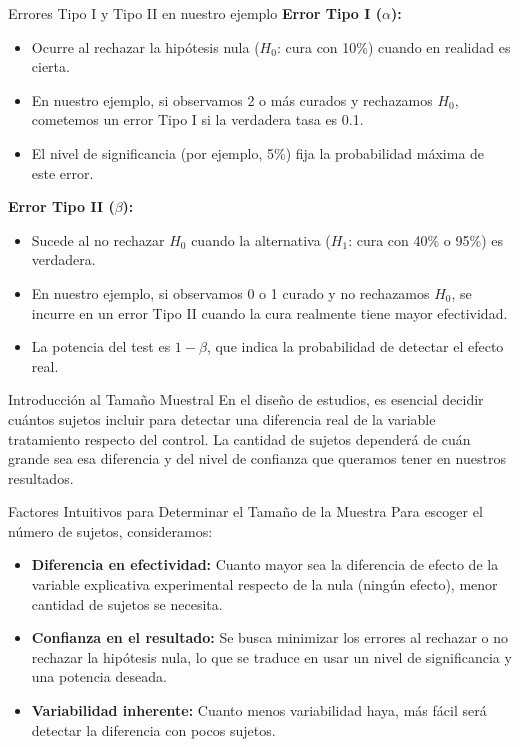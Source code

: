 ﻿\documentclass{beamer}
\begin{document}
\begin{frame}{Errores Tipo I y Tipo II en nuestro ejemplo}
\textbf{Error Tipo I ($\alpha$):}
\begin{itemize}
    \item Ocurre al rechazar la hipótesis nula ($H_0$: cura con 10\%) cuando en realidad es cierta.
    \item En nuestro ejemplo, si observamos 2 o más curados y rechazamos $H_0$, cometemos un error Tipo I si la verdadera tasa es 0.1.
    \item El nivel de significancia (por ejemplo, 5\%) fija la probabilidad máxima de este error.
\end{itemize}

\vspace{0.3cm}
\textbf{Error Tipo II ($\beta$):}
\begin{itemize}
    \item Sucede al no rechazar $H_0$ cuando la alternativa ($H_1$: cura con 40\% o 95\%) es verdadera.
    \item En nuestro ejemplo, si observamos 0 o 1 curado y no rechazamos $H_0$, se incurre en un error Tipo II cuando la cura realmente tiene mayor efectividad.
    \item La potencia del test es $1-\beta$, que indica la probabilidad de detectar el efecto real.
\end{itemize}
\end{frame}

\begin{frame}{Introducción al Tamaño Muestral}
En el diseño de estudios, es esencial decidir cuántos sujetos incluir para detectar una diferencia real de la variable tratamiento respecto del control. La cantidad de sujetos dependerá de cuán grande sea esa diferencia y del nivel de confianza que queramos tener en nuestros resultados.
\end{frame}

\begin{frame}{Factores Intuitivos para Determinar el Tamaño de la Muestra}
Para escoger el número de sujetos, consideramos:
\begin{itemize}
    \item \textbf{Diferencia en efectividad:} Cuanto mayor sea la diferencia de efecto de la variable explicativa experimental respecto de la nula (ningún efecto), menor cantidad de sujetos se necesita.
    \item \textbf{Confianza en el resultado:} Se busca minimizar los errores al rechazar o no rechazar la hipótesis nula, lo que se traduce en usar un nivel de significancia y una potencia deseada.
    \item \textbf{Variabilidad inherente:} Cuanto menos variabilidad haya, más fácil será detectar la diferencia con pocos sujetos.
\end{itemize}
\end{frame}
\end{document}
